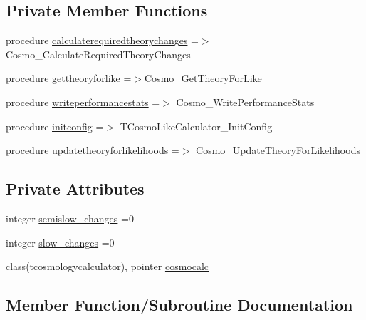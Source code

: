 \subsection*{Private Member Functions}
\begin{DoxyCompactItemize}
\item 
procedure \mbox{\hyperlink{structcalclike__cosmology_1_1tcosmolikecalculator_afe41033f3bff6882ec213e9702a2a8eb}{calculaterequiredtheorychanges}} =$>$Cosmo\+\_\+\+Calculate\+Required\+Theory\+Changes
\item 
procedure \mbox{\hyperlink{structcalclike__cosmology_1_1tcosmolikecalculator_ab4a79cd6c9996cb2d4bf030e0e4a4d6e}{gettheoryforlike}} =$>$Cosmo\+\_\+\+Get\+Theory\+For\+Like
\item 
procedure \mbox{\hyperlink{structcalclike__cosmology_1_1tcosmolikecalculator_a96bc9e862f5f4d35efd2fe47117f4476}{writeperformancestats}} =$>$ Cosmo\+\_\+\+Write\+Performance\+Stats
\item 
procedure \mbox{\hyperlink{structcalclike__cosmology_1_1tcosmolikecalculator_ae8181f641c8d758cebfa6d035649f1de}{initconfig}} =$>$ T\+Cosmo\+Like\+Calculator\+\_\+\+Init\+Config
\item 
procedure \mbox{\hyperlink{structcalclike__cosmology_1_1tcosmolikecalculator_a5bc7a0b82ae9880796a2883032241325}{updatetheoryforlikelihoods}} =$>$ Cosmo\+\_\+\+Update\+Theory\+For\+Likelihoods
\end{DoxyCompactItemize}
\subsection*{Private Attributes}
\begin{DoxyCompactItemize}
\item 
integer \mbox{\hyperlink{structcalclike__cosmology_1_1tcosmolikecalculator_ab1be9b61f69da1afc83c2e697a697e12}{semislow\+\_\+changes}} =0
\item 
integer \mbox{\hyperlink{structcalclike__cosmology_1_1tcosmolikecalculator_ada32f7ef1ed6100667d3265f99ff7afb}{slow\+\_\+changes}} =0
\item 
class(tcosmologycalculator), pointer \mbox{\hyperlink{structcalclike__cosmology_1_1tcosmolikecalculator_a1888f8907f0262b040b6cc127a897265}{cosmocalc}}
\end{DoxyCompactItemize}


\subsection{Member Function/\+Subroutine Documentation}
\mbox{\label{structcalclike__cosmology_1_1tcosmolikecalculator_afe41033f3bff6882ec213e9702a2a8eb}} 
